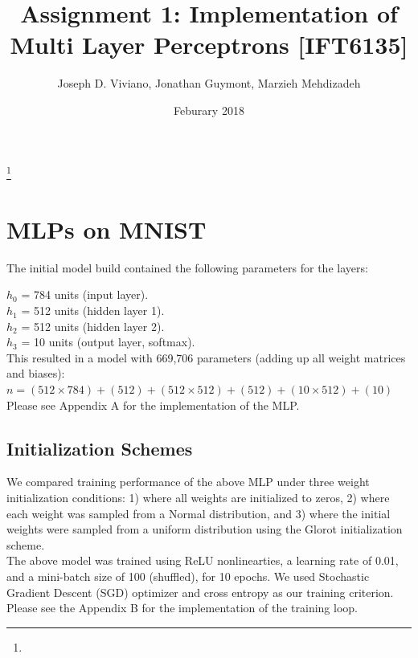 \documentclass{amsart}
\theoremstyle{definition}
\theoremstyle{remark}
\numberwithin{equation}{section}
\begin{document}
\title{Assignment 1: Implementation of Multi Layer Perceptrons [IFT6135]}

\author{Joseph D. Viviano, Jonathan Guymont, Marzieh Mehdizadeh}
\address{Universit\'e de Montr\'eal}
\curraddr{}
\thanks{}

\date{Feburary 2018}

\maketitle

\section{MLPs on MNIST}

The initial model build contained the following parameters for the layers:

$h_0$ = 784 units (input layer). \\
$h_1$ = 512 units (hidden layer 1). \\
$h_2$ = 512 units (hidden layer 2). \\
$h_3$ = 10 units (output layer, softmax). \\

This resulted in a model with 669,706 parameters (adding up all weight matrices
and biases): \\

$n = (512 \times 784) + (512) + (512 \times 512) + (512) + (10 \times 512) + (10)$ \\

Please see Appendix A for the implementation of the MLP. \\


\subsection{Initialization Schemes}

We compared training performance of the above MLP under three weight initialization
conditions: 1) where all weights are initialized to zeros, 2) where each weight
was sampled from a Normal distribution, and 3) where the initial weights were
sampled from a uniform distribution using the Glorot initialization scheme. \\

The above model was trained using ReLU nonlinearties, a learning rate of 0.01,
and a mini-batch size of 100 (shuffled), for 10 epochs. We used Stochastic
Gradient Descent (SGD) optimizer and cross entropy as our training criterion.
Please see the Appendix B for the implementation of the training loop. \\
\end{document}
